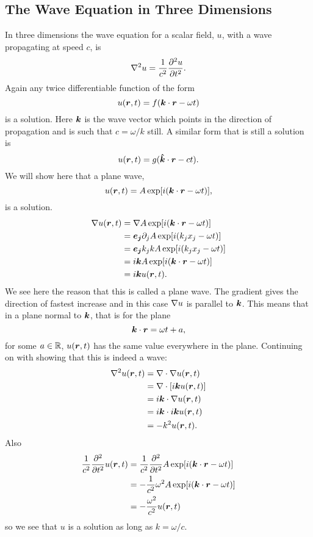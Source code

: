     \subsection{The Wave Equation in Three Dimensions}
    In three dimensions the wave equation for a scalar field, \(u\), with a wave propagating at speed \(c\), is
    \[\nabla^2 u = \frac{1}{c^2}\pdv[2]{u}{t}.\]
    Again any twice differentiable function of the form
    \[u(\bm{r}, t) = f(\bm{k}\cdot\bm{r} - \omega t)\]
    is a solution.
    Here \(\bm{k}\) is the wave vector which points in the direction of propagation and is such that \(c = \omega / k\) still.
    A similar form that is still a solution is
    \[u(\bm{r}, t) = g(\bm{\hat{k}}\cdot\bm{r} - ct).\]
    We will show here that a plane wave,
    \[u(\bm{r}, t) = A\exp[i(\bm{k}\cdot\bm{r} - \omega t)],\]
    is a solution.
    \begin{align*}
        \nabla u(\bm{r}, t) &= \nabla A\exp[i(\bm{k}\cdot\bm{r} - \omega t)]\\
        &= \bm{e_{j}}\partial_j A\exp[i(k_jx_j - \omega t)]\\
        &= \bm{e_{j}}k_jk A\exp[i(k_jx_j - \omega t)]\\
        &= i\bm{k} A\exp[i(\bm{k}\cdot\bm{r} - \omega t)]\\
        &= i\bm{k} u(\bm{r}, t).
    \end{align*}
    We see here the reason that this is called a plane wave.
    The gradient gives the direction of fastest increase and in this case \(\nabla u\) is parallel to \(\bm{k}\).
    This means that in a plane normal to \(\bm{k}\), that is for the plane
    \[\bm{k}\cdot\bm{r} = \omega t + a,\]
    for some \(a\in\mathbb{R}\), \(u(\bm{r}, t)\) has the same value everywhere in the plane.
    Continuing on with showing that this is indeed a wave:
    \begin{align*}
        \nabla^2 u(\bm{r}, t) &= \nabla\cdot\nabla u(\bm{r}, t)\\
        &= \nabla\cdot [i\bm{k}u(\bm{r}, t)]\\
        &= i\bm{k}\cdot\nabla u(\bm{r}, t)\\
        &= i\bm{k}\cdot i\bm{k}u(\bm{r}, t)\\
        &= -k^2u(\bm{r}, t).
    \end{align*}
    Also
    \begin{align*}
        \frac{1}{c^2}\pdv[2]{t}u(\bm{r}, t) &= \frac{1}{c^2}\pdv[2]{t}A\exp[i(\bm{k}\cdot\bm{r} - \omega t)]\\
        &= -\frac{1}{c^2}\omega^2A\exp[i(\bm{k}\cdot\bm{r} - \omega t)]\\
        &= -\frac{\omega^2}{c^2}u(\bm{r}, t)
    \end{align*}
    so we see that \(u\) is a solution as long as \(k = \omega/c\).
    
